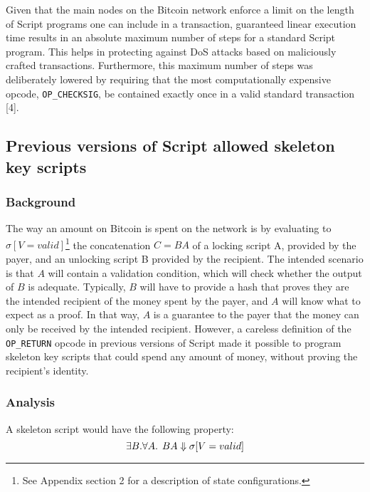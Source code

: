 \documentclass[letterpaper, 10 pt, conference]{ieeeconf}
\begin{document}
Given that the main nodes on the Bitcoin network enforce a limit on the length of Script programs one can include in a transaction, guaranteed linear execution time results in an absolute maximum number of steps for a standard Script program. This helps in protecting against DoS attacks based on maliciously crafted transactions. Furthermore, this maximum number of steps was deliberately lowered by requiring that the most computationally expensive opcode, \texttt{OP\_CHECKSIG}, be contained exactly once in a valid standard transaction [4].


\subsection{Previous versions of Script allowed skeleton key scripts}

\subsubsection{Background}
The way an amount on Bitcoin is spent on the network is by evaluating to $\sigma[V=valid]$\footnote{See Appendix section 2 for a description of state configurations.} the concatenation $C = BA$ of a locking script A, provided by the payer, and an unlocking script B provided by the recipient. The intended scenario is that $A$ will contain a validation condition, which will check whether the output of $B$ is adequate. Typically, $B$ will have to provide a hash that proves they are the intended recipient of the money spent by the payer, and $A$ will know what to expect as a proof. In that way, $A$ is a guarantee to the payer that the money can only be received by the intended recipient. However, a careless definition of the \texttt{OP\_RETURN} opcode in previous versions of Script made it possible to program skeleton key scripts that could spend any amount of money, without proving the recipient's identity.

\subsubsection{Analysis}
A skeleton script would have the following property: 
$$\exists B. \forall A. \hspace{1.5mm} BA \Downarrow \sigma[V=valid]$$
\end{document}
